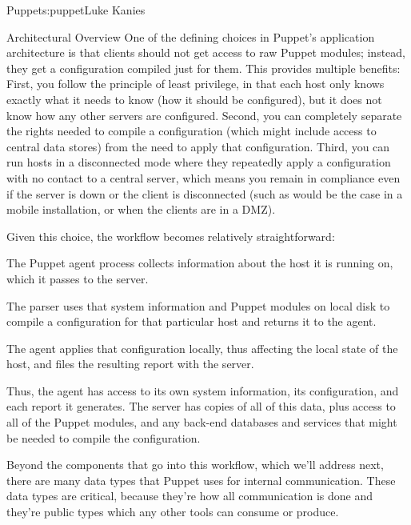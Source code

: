 \begin{aosachapter}{Puppet}{s:puppet}{Luke Kanies}
\begin{aosasect1}{Architectural Overview}
One of the defining choices in Puppet's application architecture is
that clients should not get access to raw Puppet modules; instead,
they get a configuration compiled just for them.  This provides
multiple benefits: First, you follow the principle of least privilege,
in that each host only knows exactly what it needs to know (how it
should be configured), but it does not know how any other servers are
configured.  Second, you can completely separate the rights needed to
compile a configuration (which might include access to central data
stores) from the need to apply that configuration.  Third, you can run
hosts in a disconnected mode where they repeatedly apply a
configuration with no contact to a central server, which means you
remain in compliance even if the server is down or the client is
disconnected (such as would be the case in a mobile installation, or
when the clients are in a DMZ).

Given this choice, the workflow becomes relatively straightforward:

\begin{aosaenumerate}

\item The Puppet agent process collects information about the host it
  is running on, which it passes to the server.

\item The parser uses that system information and Puppet modules on
  local disk to compile a configuration for that particular host and
  returns it to the agent.

\item The agent applies that configuration locally, thus affecting the
  local state of the host, and files the resulting report with the
  server.

\end{aosaenumerate}



Thus, the agent has access to its own system information, its
configuration, and each report it generates.  The server has copies of
all of this data, plus access to all of the Puppet modules, and any
back-end databases and services that might be needed to compile the
configuration.

Beyond the components that go into this workflow, which we'll address
next, there are many data types that Puppet uses for internal
communication. These data types are critical, because they're how all
communication is done and they're public types which any other tools
can consume or produce.


\end{aosasect1}
\end{aosachapter}
